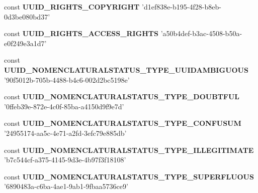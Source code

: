 \begin{DoxyCompactItemize}
\item 
\hypertarget{uuids_8php_ae5ea23645d30e4b5f599fe41402831fd}{const {\bfseries U\-U\-I\-D\-\_\-\-R\-I\-G\-H\-T\-S\-\_\-\-C\-O\-P\-Y\-R\-I\-G\-H\-T} 'd1ef838e-\/b195-\/4f28-\/b8eb-\/0d3be080bd37'}\label{uuids_8php_ae5ea23645d30e4b5f599fe41402831fd}

\item 
\hypertarget{uuids_8php_a004f91f1bed2f05a501127938c2d89ca}{const {\bfseries U\-U\-I\-D\-\_\-\-R\-I\-G\-H\-T\-S\-\_\-\-A\-C\-C\-E\-S\-S\-\_\-\-R\-I\-G\-H\-T\-S} 'a50b4def-\/b3ac-\/4508-\/b50a-\/e0f249e3a1d7'}\label{uuids_8php_a004f91f1bed2f05a501127938c2d89ca}

\item 
\hypertarget{uuids_8php_a16bd41a42d26847c09db6296d79fa0b8}{const {\bfseries U\-U\-I\-D\-\_\-\-N\-O\-M\-E\-N\-C\-L\-A\-T\-U\-R\-A\-L\-S\-T\-A\-T\-U\-S\-\_\-\-T\-Y\-P\-E\-\_\-\-U\-U\-I\-D\-A\-M\-B\-I\-G\-U\-O\-U\-S} '90f5012b-\/705b-\/4488-\/b4c6-\/002d2bc5198e'}\label{uuids_8php_a16bd41a42d26847c09db6296d79fa0b8}

\item 
\hypertarget{uuids_8php_afe60a76e07f582b780e30df65538d905}{const {\bfseries U\-U\-I\-D\-\_\-\-N\-O\-M\-E\-N\-C\-L\-A\-T\-U\-R\-A\-L\-S\-T\-A\-T\-U\-S\-\_\-\-T\-Y\-P\-E\-\_\-\-D\-O\-U\-B\-T\-F\-U\-L} '0ffeb39e-\/872e-\/4c0f-\/85ba-\/a4150d9f9e7d'}\label{uuids_8php_afe60a76e07f582b780e30df65538d905}

\item 
\hypertarget{uuids_8php_a4b55a1111554e022ff333212ea0bacfd}{const {\bfseries U\-U\-I\-D\-\_\-\-N\-O\-M\-E\-N\-C\-L\-A\-T\-U\-R\-A\-L\-S\-T\-A\-T\-U\-S\-\_\-\-T\-Y\-P\-E\-\_\-\-C\-O\-N\-F\-U\-S\-U\-M} '24955174-\/aa5c-\/4e71-\/a2fd-\/3efc79e885db'}\label{uuids_8php_a4b55a1111554e022ff333212ea0bacfd}

\item 
\hypertarget{uuids_8php_a19ae371c6780e07e0146481f97d76e58}{const {\bfseries U\-U\-I\-D\-\_\-\-N\-O\-M\-E\-N\-C\-L\-A\-T\-U\-R\-A\-L\-S\-T\-A\-T\-U\-S\-\_\-\-T\-Y\-P\-E\-\_\-\-I\-L\-L\-E\-G\-I\-T\-I\-M\-A\-T\-E} 'b7c544cf-\/a375-\/4145-\/9d3e-\/4b97f3f18108'}\label{uuids_8php_a19ae371c6780e07e0146481f97d76e58}

\item 
\hypertarget{uuids_8php_a52f858a33daeb2e73a6c74abfa0ad10d}{const {\bfseries U\-U\-I\-D\-\_\-\-N\-O\-M\-E\-N\-C\-L\-A\-T\-U\-R\-A\-L\-S\-T\-A\-T\-U\-S\-\_\-\-T\-Y\-P\-E\-\_\-\-S\-U\-P\-E\-R\-F\-L\-U\-O\-U\-S} '6890483a-\/c6ba-\/4ae1-\/9ab1-\/9fbaa5736ce9'}\label{uuids_8php_a52f858a33daeb2e73a6c74abfa0ad10d}


\end{DoxyCompactItemize}
